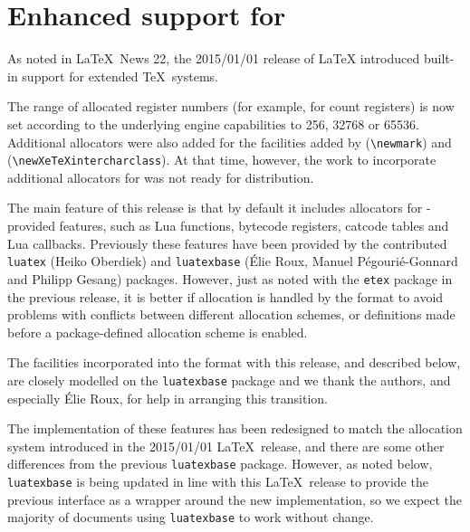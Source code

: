 \documentclass{ltnews}
\providecommand\pkg[1]{\texttt{#1}}
\begin{document}
\maketitle

\tableofcontents

\section{Enhanced support for }

As noted in \LaTeX\ News 22, the 2015/01/01 release of \LaTeX{}
introduced built-in support for extended \TeX\ systems.

The range of allocated register numbers (for example, for count
registers) is now set according to the underlying engine capabilities
to 256, 32768 or 65536. Additional allocators were also added for the
facilities added by  (\verb|\newmark|) and 
(\verb|\newXeTeXintercharclass|). At that time, however, the work to
incorporate additional allocators for  was not ready for
distribution.

The main feature of this release is  that by default it includes
allocators for -provided features, such as Lua
functions, bytecode registers, catcode tables and Lua callbacks.
Previously these features have been provided by the contributed
\pkg{luatex} (Heiko Oberdiek) and \pkg{luatexbase}
(\'{E}lie Roux,
  Manuel P\'{e}gouri\'{e}-Gonnard and Philipp Gesang)
packages. However, just as
noted with the \pkg{etex} package in the previous release, it is
better if allocation is handled by the format to avoid problems with
conflicts between different allocation schemes, or definitions made
before a package-defined allocation scheme is enabled.

The facilities incorporated into the format with this release, and
described below, are closely modelled on the \pkg{luatexbase}
package and we thank the authors, and especially \'{E}lie Roux, for
help in arranging this transition.

The implementation of these  features has been
redesigned to match the allocation system introduced in the 2015/01/01
\LaTeX\ release, and there are some other differences from the previous
\pkg{luatexbase} package. However, as noted below,
\pkg{luatexbase} is being updated in line with this \LaTeX\ release
to provide the previous interface as a wrapper around the new
implementation, so we expect the majority of documents using
\pkg{luatexbase} to work without change.
\end{document}
